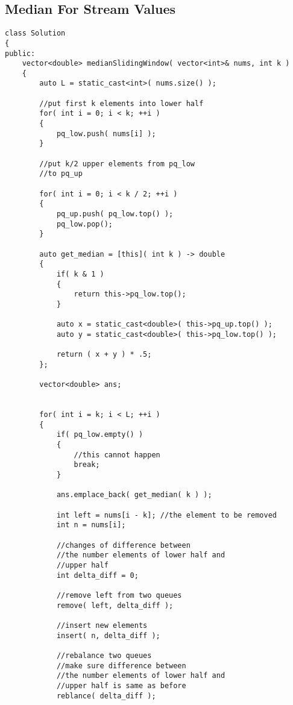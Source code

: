 \subsection{Median For Stream Values}

\setcounter{lstlisting}{0}
\begin{lstlisting}[style=customc, caption={Using Two Heaps}]
class Solution
{
public:
    vector<double> medianSlidingWindow( vector<int>& nums, int k )
    {
        auto L = static_cast<int>( nums.size() );

        //put first k elements into lower half
        for( int i = 0; i < k; ++i )
        {
            pq_low.push( nums[i] );
        }

        //put k/2 upper elements from pq_low
        //to pq_up

        for( int i = 0; i < k / 2; ++i )
        {
            pq_up.push( pq_low.top() );
            pq_low.pop();
        }

        auto get_median = [this]( int k ) -> double
        {
            if( k & 1 )
            {
                return this->pq_low.top();
            }

            auto x = static_cast<double>( this->pq_up.top() );
            auto y = static_cast<double>( this->pq_low.top() );

            return ( x + y ) * .5;
        };

        vector<double> ans;


        for( int i = k; i < L; ++i )
        {
            if( pq_low.empty() )
            {
                //this cannot happen
                break;
            }

            ans.emplace_back( get_median( k ) );

            int left = nums[i - k]; //the element to be removed
            int n = nums[i];

            //changes of difference between
            //the number elements of lower half and
            //upper half
            int delta_diff = 0;

            //remove left from two queues
            remove( left, delta_diff );

            //insert new elements
            insert( n, delta_diff );

            //rebalance two queues
            //make sure difference between
            //the number elements of lower half and
            //upper half is same as before
            reblance( delta_diff );


\end{lstlisting}
